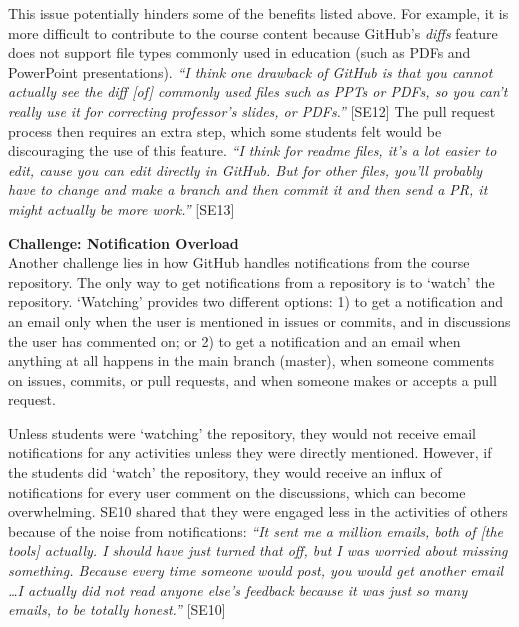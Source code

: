 This issue potentially hinders some of the benefits listed above. For example, it is more difficult to contribute to the course content because GitHub's \emph{diffs} feature does not support file types commonly used in education (such as PDFs and PowerPoint presentations). \textit{``I think one drawback of GitHub is that you cannot actually see the diff [of] commonly used files such as PPTs or PDFs, so you can't really use it for correcting professor's slides, or PDFs.''} [SE12] The pull request process then requires an extra step, which some students felt would be discouraging the use of this feature. \textit{``I think for readme files, it's a lot easier to edit, cause you can edit directly in GitHub. But for other files, you'll probably have to change and make a branch and then commit it and then send a PR, it might actually be more work.''} [SE13]

\textbf{Challenge: Notification Overload} \\
Another challenge lies in how GitHub handles notifications from the course repository. The only way to get notifications from a repository is to `watch' the repository. `Watching' provides two different options: 1) to get a notification and an email only when the user is mentioned in issues or commits, and in discussions the user has commented on; or 2) to get a notification and an email when anything at all happens in the main branch (master), when someone comments on issues, commits, or pull requests, and when someone makes or accepts a pull request. %

Unless students were `watching' the repository, they would not receive email notifications for any activities unless they were directly mentioned. However, if the students did `watch' the repository, they would receive an influx of notifications for every user comment on the discussions, which can become overwhelming. SE10 shared that they were engaged less in the activities of others because of the noise from notifications: \textit{``It sent me a million emails, both of [the tools] actually. I should have just turned that off, but I was worried about missing something. Because every time someone would post, you would get another email \ldots I actually did not read anyone else's feedback because it was just so many emails, to be totally honest.''} [SE10]

